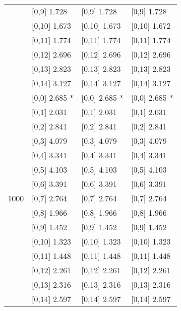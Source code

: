 \begin{table}
\begin{tabular}[t]{llll}
 & {}[0,9] 1.728 & {}[0,9] 1.728 & {}[0,9] 1.728\\
\addlinespace
 & {}[0,10] 1.673 & {}[0,10] 1.673 & {}[0,10] 1.672\\
 & {}[0,11] 1.774 & {}[0,11] 1.774 & {}[0,11] 1.774\\
 & {}[0,12] 2.696 & {}[0,12] 2.696 & {}[0,12] 2.696\\
 & {}[0,13] 2.823 & {}[0,13] 2.823 & {}[0,13] 2.823\\
 & {}[0,14] 3.127 & {}[0,14] 3.127 & {}[0,14] 3.127\\
\addlinespace
 & {}[0,0] 2.685 * & {}[0,0] 2.685 * & {}[0,0] 2.685 *\\
 & {}[0,1] 2.031 & {}[0,1] 2.031 & {}[0,1] 2.031\\
 & {}[0,2] 2.841 & {}[0,2] 2.841 & {}[0,2] 2.841\\
 & {}[0,3] 4.079 & {}[0,3] 4.079 & {}[0,3] 4.079\\
 & {}[0,4] 3.341 & {}[0,4] 3.341 & {}[0,4] 3.341\\
\addlinespace
 & {}[0,5] 4.103 & {}[0,5] 4.103 & {}[0,5] 4.103\\
 & {}[0,6] 3.391 & {}[0,6] 3.391 & {}[0,6] 3.391\\
1000 & {}[0,7] 2.764 & {}[0,7] 2.764 & {}[0,7] 2.764\\
 & {}[0,8] 1.966 & {}[0,8] 1.966 & {}[0,8] 1.966\\
 & {}[0,9] 1.452 & {}[0,9] 1.452 & {}[0,9] 1.452\\
\addlinespace
 & {}[0,10] 1.323 & {}[0,10] 1.323 & {}[0,10] 1.323\\
 & {}[0,11] 1.448 & {}[0,11] 1.448 & {}[0,11] 1.448\\
 & {}[0,12] 2.261 & {}[0,12] 2.261 & {}[0,12] 2.261\\
 & {}[0,13] 2.316 & {}[0,13] 2.316 & {}[0,13] 2.316\\
 & {}[0,14] 2.597 & {}[0,14] 2.597 & {}[0,14] 2.597\\
\bottomrule
\end{tabular}
\end{table}
